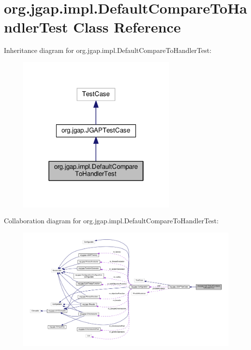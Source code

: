 \hypertarget{classorg_1_1jgap_1_1impl_1_1_default_compare_to_handler_test}{\section{org.\-jgap.\-impl.\-Default\-Compare\-To\-Handler\-Test Class Reference}
\label{classorg_1_1jgap_1_1impl_1_1_default_compare_to_handler_test}
}


Inheritance diagram for org.\-jgap.\-impl.\-Default\-Compare\-To\-Handler\-Test\-:
\nopagebreak
\begin{figure}[H]
\begin{center}
\leavevmode
\includegraphics[width=226pt]{classorg_1_1jgap_1_1impl_1_1_default_compare_to_handler_test__inherit__graph}
\end{center}
\end{figure}


Collaboration diagram for org.\-jgap.\-impl.\-Default\-Compare\-To\-Handler\-Test\-:
\nopagebreak
\begin{figure}[H]
\begin{center}
\leavevmode
\includegraphics[width=350pt]{classorg_1_1jgap_1_1impl_1_1_default_compare_to_handler_test__coll__graph}
\end{center}
\end{figure}
